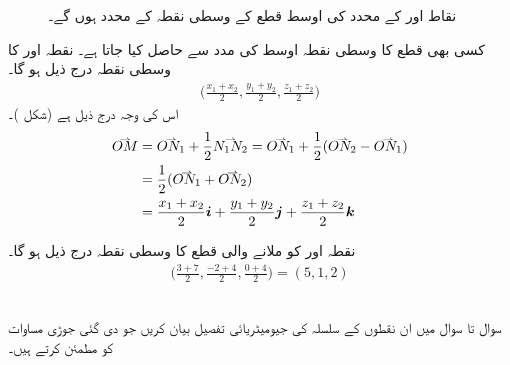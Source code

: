 \begin{figure}
\centering
{}
\caption{نقاط  اور  کے محدد کی اوسط قطع  کے وسطی نقطہ کے محدد ہوں گے۔}
\label{شکل_سمتیہ_قطع_کا_وسطی_نقطہ}
\end{figure}
کسی بھی قطع کا وسطی نقطہ اوسط کی مدد سے حاصل کیا جاتا ہے۔ نقطہ  اور  کا وسطی نقطہ درج ذیل ہو گا۔
\begin{align*}
\big(\frac{x_1+x_2}{2},\frac{y_1+y_2}{2},\frac{z_1+z_2}{2}\big)
\end{align*}
اس کی وجہ درج ذیل ہے (شکل )۔
\begin{align*}
\krightharpoonup{OM}&=\krightharpoonup{ON_1}+\frac{1}{2}\krightharpoonup{N_1N_2}=\krightharpoonup{ON_1}+\frac{1}{2}(\krightharpoonup{ON_2}-\krightharpoonup{ON_1})\\
&=\frac{1}{2}(\krightharpoonup{ON_1}+\krightharpoonup{ON_2})\\
&=\frac{x_1+x_2}{2}\ai+\frac{y_1+y_2}{2}\aj+\frac{z_1+z_2}{2}\ak
\end{align*}

نقطہ  اور  کو ملانے والی قطع کا وسطی نقطہ درج ذیل ہو گا۔
\begin{align*}
\big(\frac{3+7}{2},\frac{-2+4}{2},\frac{0+4}{2}\big)=(5,1,2)
\end{align*}

\\
سوال  تا سوال  میں ان نقطوں کے سلسلہ کی جیومیٹریائی تفصیل بیان کریں جو دی گئی جوڑی مساوات کو مطمئن کرتے ہیں۔

